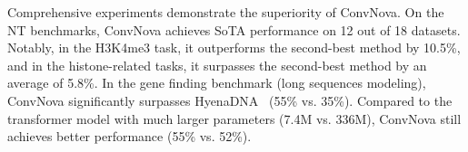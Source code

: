 



Comprehensive experiments demonstrate the superiority of ConvNova.  On the NT benchmarks, ConvNova achieves SoTA performance on 12 out of 18 datasets. Notably, in the H3K4me3 task, it outperforms the second-best method by 10.5\%, and in the histone-related tasks, it surpasses the second-best method by an average of 5.8\%. In the gene finding benchmark (long sequences modeling), ConvNova significantly surpasses HyenaDNA~\citep{nguyen2024hyenadna} (55\% vs. 35\%). Compared to the transformer model with much larger parameters (7.4M vs. 336M), ConvNova still achieves better performance (55\% vs. 52\%).

